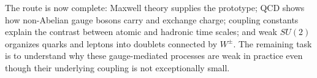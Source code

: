 \begin{classroomqa}
\end{classroomqa}

The route is now complete: Maxwell theory supplies the prototype; QCD shows
how non-Abelian gauge bosons carry and exchange charge; coupling constants
explain the contrast between atomic and hadronic time scales; and weak
\(SU(2)\) organizes quarks and leptons into doublets connected by
\(W^\pm\). The remaining task is to understand why these gauge-mediated
processes are weak in practice even though their underlying coupling is not
exceptionally small.
